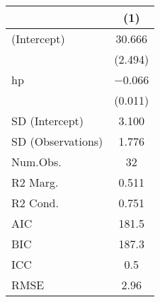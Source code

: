 \begin{table}
\centering
\begin{tabular}[t]{lc}
\toprule
  & (1)\\
\midrule
(Intercept) & \num{30.666}\\
 & (\num{2.494})\\
hp & \num{-0.066}\\
 & (\num{0.011})\\
SD (Intercept) & \num{3.100}\\
SD (Observations) & \num{1.776}\\
Num.Obs. & \num{32}\\
R2 Marg. & \num{0.511}\\
\midrule
R2 Cond. & \num{0.751}\\
AIC & \num{181.5}\\
BIC & \num{187.3}\\
ICC & \num{0.5}\\
RMSE & \num{2.96}\\
\bottomrule
\end{tabular}
\end{table}
